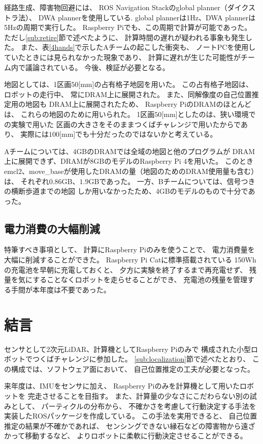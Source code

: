 \documentclass[twocolumn,9pt]{jsproceedings}
\begin{document}
経路生成、障害物回避には、
ROS Navigation Stackのglobal planner（ダイクストラ法）、
DWA plannerを使用している. 
global plannerは1Hz、DWA plannerは5Hzの周期で実行した。
Raspberry Piでも、この周期で計算が可能であった。
ただし\ref{sub:retire}節で述べたように、
計算時間の遅れが疑われる事象も発生した。
また、表\ref{4hands}で示したAチームの起こした衝突も、
ノートPCを使用していたときには見られなかった現象であり、
計算に遅れが生じた可能性がチーム内で議論されている。
今後、検証が必要となる。


地図としては、1区画$50$[mm]の占有格子地図を用いた。
この占有格子地図は、ロボットの走行中、
常にDRAM上に展開された。
また、同解像度の自己位置推定用の地図も
DRAM上に展開されたため、
Raspberry PiのDRAMのほとんどは、
これらの地図のために用いられた。
1区画$50$[mm]としたのは、狭い環境での実験で用いた
区画の大きさをそのままつくばチャレンジで用いたからであり、
実際には$100$[mm]でも十分だったのではないかと考えている。

Aチームについては、4GBのDRAMでは全域の地図と他のプログラムが
DRAM上に展開できず、DRAMが8GBのモデルのRaspberry Pi 4を用いた。
このときemcl2、move\_baseが使用したDRAMの量（地図のためのDRAM使用量も含む）は、
それぞれ$0.86$GB、$1.9$GBであった。
一方、Bチームについては、信号つきの横断歩道までの地図
しか用いなかったため、4GBのモデルのもので十分であった。


\subsection{電力消費の大幅削減}

特筆すべき事項として、
計算にRaspberry Piのみを使うことで、
電力消費量を大幅に削減することができた。
Raspberry Pi Catに標準搭載されている
150Whの充電池を早朝に充電しておくと、
夕方に実験を終了するまで再充電せず、
残量を気にすることなくロボットを走らせることができ、
充電池の残量を管理する手間が本年度は不要であった。


\section{結言}

センサとして2次元LiDAR、計算機としてRaspberry Piのみで
構成された小型ロボットでつくばチャレンジに参加した。
\ref{sub:localization}節で述べたとおり、
この構成では、ソフトウェア面において、
自己位置推定の工夫が必要となった。

来年度は、IMUをセンサに加え、
Raspberry Piのみを計算機として用いたロボットを
完走させることを目指す。
また、計算量の少なさにこだわらない別の試みとして、
パーティクルの分布から、
不確かさを考慮して行動決定する手法を
実装したROSパッケージを作成している\cite{pfc}。
この手法を実用できると、
自己位置推定の結果が不確かであれば、
センシングできない縁石などの障害物から遠ざかって移動するなど、
よりロボットに柔軟に行動決定させることができる。
\end{document}
